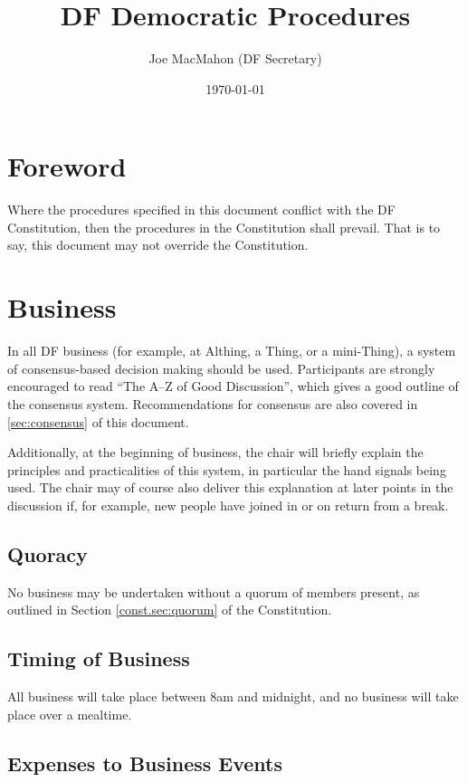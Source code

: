 \documentclass[a4paper, 11pt]{article} %
\title{DF Democratic Procedures}
\author{Joe MacMahon (DF Secretary)}
\date{\today}
\begin{document}
\maketitle

\tableofcontents

\section{Foreword}
Where the procedures specified in this document conflict with the DF Constitution, then the procedures in the Constitution shall prevail.  That is to say, this document may not override the Constitution.

\section{Business}
In all DF business (for example, at Althing, a Thing, or a mini-Thing), a system of consensus-based decision making should be used.  Participants are strongly encouraged to read ``The A--Z of Good Discussion'', which gives a good outline of the consensus system.  Recommendations for consensus are also covered in \autoref{sec:consensus} of this document.

Additionally, at the beginning of business, the chair will briefly explain the principles and practicalities of this system, in particular the hand signals being used.  The chair may of course also deliver this explanation at later points in the discussion if, for example, new people have joined in or on return from a break.

\subsection{Quoracy}
No business may be undertaken without a quorum of members present, as outlined in Section \ref{const.sec:quorum} of the Constitution.

\subsection{Timing of Business}
All business will take place between 8am and midnight, and no business will take place over a mealtime.

\subsection{Expenses to Business Events}
\end{document}
